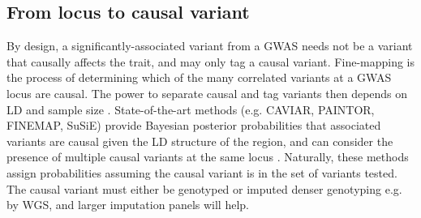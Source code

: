 \begin{outline}
%

\subsection{From locus to causal variant}

\1 By design, a significantly-associated variant from a \gls{GWAS} needs not be a variant that causally affects the trait, and may only tag a causal variant.
    \2 Fine-mapping is the process of determining which of the many correlated variants at a \gls{GWAS} locus are causal.
    \2 The power to separate causal and tag variants then depends on \gls{LD} and sample size \autocite{visscher201710YearsGWAS}.
    \2 State-of-the-art methods (e.g. CAVIAR, PAINTOR, FINEMAP, SuSiE) provide Bayesian posterior probabilities that associated variants are causal given the \gls{LD} structure of the region, and can consider the presence of multiple causal variants at the same locus \autocite{schaid2018GenomewideAssociationsCandidate}.
    \2 Naturally, these methods assign probabilities assuming the causal variant is in the set of variants tested.
    \2 The causal variant must either be genotyped or imputed denser genotyping e.g. by WGS, and larger imputation panels will help.


\end{outline}
